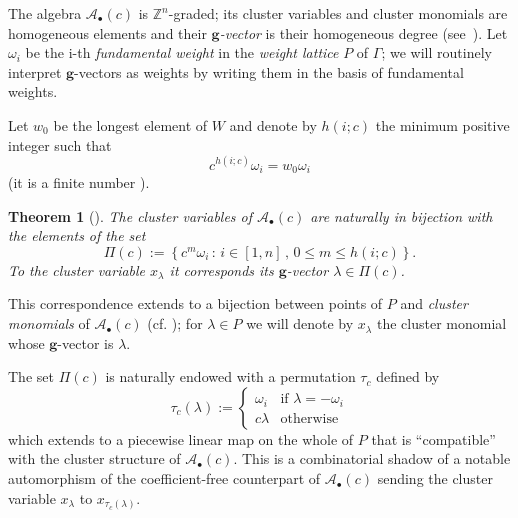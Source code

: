 \documentclass[pdftex]{sigma}
\numberwithin{equation}{section}
\numberwithin{figure}{section}
\newtheorem{Theorem}{Theorem}[section]
\newcommand{\cA}{\mathcal{A}}
\newcommand{\ZZ}{\mathbb{Z}}
\newcommand{\bg}{\mathbf{g}}
\begin{document}
  The algebra $\cA_\bullet(c)$ is $\ZZ^n$-graded; its cluster variables and cluster monomials are homogeneous elements and their \emph{$\bg$-vector} is their homogeneous degree (see~\cite[Section~6]{FZ07}).
  Let $\omega_i$ be the i-th \emph{fundamental weight} in the \emph{weight lattice} $P$ of $\Gamma$; we will routinely interpret $\bg$-vectors as weights by writing them in the basis of fundamental weights.

  Let $w_0$ be the longest element of $W$ and denote by $h(i;c)$ the minimum positive integer such that
  \[
    c^{h(i;c)}\omega_i = w_0\omega_i
  \]
  (it is a finite number \cite[Proposition 1.3]{YZ08}).
  \begin{Theorem}[{\cite[Theorem 1.4]{YZ08}}]
    The cluster variables of $\cA_\bullet(c)$ are naturally in bijection with the elements of the set
    \[
      \Pi(c)
      :=
      \left\{
        c^m\omega_i \, :\, i\in[1,n] \, , \, 0\leq m \leq h(i;c)
      \right\}.
    \]
    To the cluster variable $x_\lambda$ it corresponds its $\bg$-vector $\lambda\in\Pi(c)$.
  \end{Theorem}
  This correspondence extends to a bijection between points of $P$ and \emph{cluster monomials} of $\cA_\bullet(c)$ (cf. \cite[Theorem 1.2]{Ste13}); for $\lambda\in P$ we will denote by $x_\lambda$ the cluster monomial whose $\bg$-vector is $\lambda$.

  The set $\Pi(c)$ is naturally endowed with a permutation $\tau_c$ defined by
  \[
    \tau_c (\lambda)
    :=
    \begin{cases}
      \omega_i  & \text{if $\lambda = -\omega_i$} \\
      c\lambda  & \text{otherwise}
    \end{cases}
  \]
  which extends to a piecewise linear map on the whole of $P$ that is ``compatible'' with the cluster structure of $\cA_\bullet(c)$.
  This is a combinatorial shadow of a notable automorphism of the coefficient-free counterpart of $\cA_\bullet(c)$ sending the cluster variable $x_\lambda$ to $x_{\tau_c(\lambda)}$.
\end{document}

